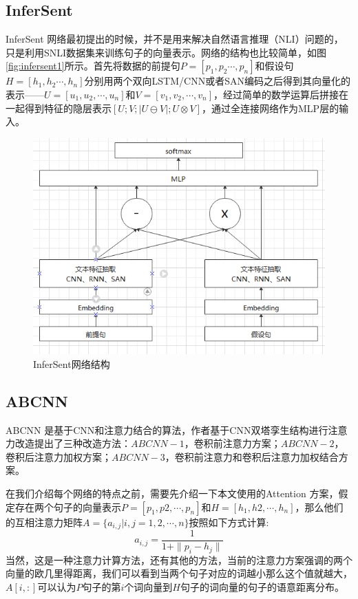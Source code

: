 \documentclass[twoside,a4paper,12pt]{book}%
\begin{document}
\subsection{InferSent}
InferSent 网络最初提出的时候，并不是用来解决自然语言推理（\gls{NLI}）问题的，只是利用SNLI数据集来训练句子的向量表示。网络的结构也比较简单，如图\ref{fig:infersent1}所示。首先将数据的前提句$P=[p_1,p_2\cdots,p_n]$和假设句$H=[h_1,h_2\cdots,h_n]$分别用两个双向\gls{LSTM}/\gls{CNN}或者\gls{SAN}编码之后得到其向量化的表示——$U=[u_1,u_2,\cdots,u_n]$和$V=[v_1,v_2,\cdots,v_n]$，经过简单的数学运算后拼接在一起得到特征的隐层表示$[U;V;|U \ominus V|;U\otimes V]$，通过全连接网络作为\gls{MLP}层的输入。
\begin{figure}[h]
\begin{center}
\includegraphics[width=5.6in]{figures/infer_sent.png}
\caption{InferSent网络结构}
\label{fig:infer_sent}
\end{center}
\end{figure}
\subsection{ABCNN}
ABCNN 是基于\gls{CNN}和注意力结合的算法，作者基于\gls{CNN}双塔孪生结构进行注意力改造提出了三种改造方法：$ABCNN-1$，卷积前注意力方案；$ABCNN-2$，卷积后注意力加权方案；$ABCNN-3$，卷积前注意力和卷积后注意力加权结合方案。

在我们介绍每个网络的特点之前，需要先介绍一下本文使用的Attention 方案，假定存在两个句子的向量表示$P=[p_1,p2,\cdots,p_n]$和$H=[h_1,h2,\cdots,h_n]$，那么他们的互相注意力矩阵$A=\{a_{i,j}|i,j=1,2,\cdots,n\}$按照如下方式计算:
$$
a_{i,j} = \frac{1}{1+\|p_i-h_j\|}
$$
当然，这是一种注意力计算方法，还有其他的方法，当前的注意力方案强调的两个向量的欧几里得距离，我们可以看到当两个句子对应的词越小那么这个值就越大，$A[i,:]$可以认为$P$句子的第$i$个词向量到$H$句子的词向量的句子的语意距离分布。
\end{document}
